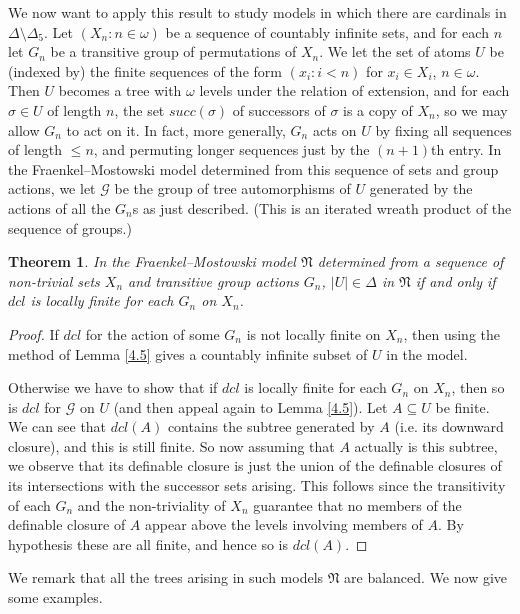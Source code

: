 \documentclass[a4paper,reqno]{amsart}
\numberwithin{equation}{section}
\newtheorem{theorem}{Theorem}[section]
\begin{document}
We now want to apply this result to study models in which there are cardinals in $\Delta \setminus \Delta_5$. 
Let $(X_n: n \in \omega)$ be a sequence of countably infinite sets, and for each $n$ let $G_n$ be a transitive
group of permutations of $X_n$. We let the set of atoms $U$ be (indexed by) the finite sequences of the form 
$(x_i: i < n)$ for $x_i \in X_i$, $n \in \omega$. Then $U$ becomes a tree with $\omega$ levels under the 
relation of extension, and for each $\sigma \in U$ of length $n$, the set $succ(\sigma)$ of successors of 
$\sigma$ is a copy of $X_n$, so we may allow $G_n$ to act on it. In fact, more generally, $G_n$ acts on $U$ 
by fixing all sequences of length $\le n$, and permuting longer sequences just by the $(n+1)$th entry. In the 
Fraenkel--Mostowski model determined from this sequence of sets and group actions, we let $\mathcal G$ be the 
group of tree automorphisms of $U$ generated by the actions of all the $G_n$s as just described. (This is an 
iterated wreath product of the sequence of groups.)

\begin{theorem} \label{4.6} In the Fraenkel--Mostowski model $\mathfrak N$ determined from a sequence of
non-trivial sets $X_n$ and transitive group actions $G_n$, $|U| \in \Delta$ in $\mathfrak N$ if and only if 
$dcl$ is locally finite for each $G_n$ on $X_n$.  \end{theorem}

\begin{proof} If $dcl$ for the action of some $G_n$ is not locally finite on $X_n$, then using the method of 
Lemma \ref{4.5} gives a countably infinite subset of $U$ in the model.

Otherwise we have to show that if $dcl$ is locally finite for each $G_n$ on $X_n$, then so is $dcl$ for 
$\mathcal G$ on $U$ (and then appeal again to Lemma \ref{4.5}). Let $A \subseteq U$ be finite. We can see
that $dcl(A)$ contains the subtree generated by $A$ (i.e. its downward closure), and this is still finite.
So now assuming that $A$ actually is this subtree, we observe that its definable closure is just the union
of the definable closures of its intersections with the successor sets arising. This follows since the
transitivity of each $G_n$ and the non-triviality of $X_n$ guarantee that no members of the definable closure 
of $A$ appear above the levels involving members of $A$. By hypothesis these are all finite, and hence so 
is $dcl(A)$.    \end{proof}

We remark that all the trees arising in such models $\mathfrak N$ are balanced. We now give some examples.
\end{document}
